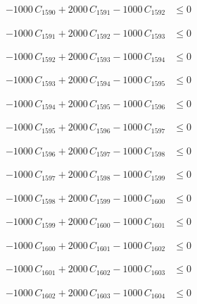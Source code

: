 \documentclass[a4paper,11pt]{article}
\begin{document}
\begin{align}
-1000\,C_{1590} + 2000\,C_{1591} - 1000\,C_{1592} &\leq 0 \nonumber
\end{align}

\begin{align}
-1000\,C_{1591} + 2000\,C_{1592} - 1000\,C_{1593} &\leq 0 \nonumber
\end{align}

\begin{align}
-1000\,C_{1592} + 2000\,C_{1593} - 1000\,C_{1594} &\leq 0 \nonumber
\end{align}

\begin{align}
-1000\,C_{1593} + 2000\,C_{1594} - 1000\,C_{1595} &\leq 0 \nonumber
\end{align}

\begin{align}
-1000\,C_{1594} + 2000\,C_{1595} - 1000\,C_{1596} &\leq 0 \nonumber
\end{align}

\begin{align}
-1000\,C_{1595} + 2000\,C_{1596} - 1000\,C_{1597} &\leq 0 \nonumber
\end{align}

\begin{align}
-1000\,C_{1596} + 2000\,C_{1597} - 1000\,C_{1598} &\leq 0 \nonumber
\end{align}

\begin{align}
-1000\,C_{1597} + 2000\,C_{1598} - 1000\,C_{1599} &\leq 0 \nonumber
\end{align}

\begin{align}
-1000\,C_{1598} + 2000\,C_{1599} - 1000\,C_{1600} &\leq 0 \nonumber
\end{align}

\begin{align}
-1000\,C_{1599} + 2000\,C_{1600} - 1000\,C_{1601} &\leq 0 \nonumber
\end{align}

\begin{align}
-1000\,C_{1600} + 2000\,C_{1601} - 1000\,C_{1602} &\leq 0 \nonumber
\end{align}

\begin{align}
-1000\,C_{1601} + 2000\,C_{1602} - 1000\,C_{1603} &\leq 0 \nonumber
\end{align}

\begin{align}
-1000\,C_{1602} + 2000\,C_{1603} - 1000\,C_{1604} &\leq 0 \nonumber
\end{align}
\end{document}
